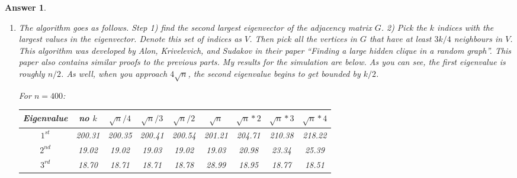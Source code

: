 \documentclass[12pt]{article}
\theoremstyle{colon}
\newtheorem*{answer}{Answer}
\begin{document}
\begin{answer}
\begin{enumerate}[label=\alph*)]
    Now let $1_k$ be the indicator of the $k$-clique indices of the graph.
    \begin{gather*}
      \lambda_2 \leq \frac{1_k^T A' 1_k}{k} = \frac{1_k^T A 1_k - 1_k^T \lambda_1 \frac{v v^T}{\lVert v \rVert^2} 1_k}{k} \\
      = \frac{1_k^T A 1_k - \lambda_1 \frac{\langle 1_k, v \rangle^2}{\lVert v \rVert^2}}{k}
    \end{gather*}

    Since $1_k$ is the indicator, then $1_k^T A 1_k$ counts the $k$-clique twice iteratively so it equals $k^2$. We will also replace $v = 1 - s$.
    \begin{gather*}
      = \frac{k^2 - \lambda_1 \frac{\langle 1_k, 1-s \rangle^2}{\lVert 1-s \rVert^2}}{k}
    \end{gather*}

    Going further requires one to use the bound on $\lambda_1$ found in the first question. That is, $\lambda_1 \leq \sqrt{n}$. Another bound to use would be $\lVert 1-s \rVert^2 = 1^T 1 - 2 s^T 1 + \lVert s \rVert^2 \leq n - s^T 1 + 5 + 5k^3/n^2 = O(k^3/n^2)$.

    \item The algorithm goes as follows. Step 1) find the second largest eigenvector of the adjacency matrix $G$. 2) Pick the $k$ indices with the largest values in the eigenvector. Denote this set of indices as $V$. Then pick all the vertices in $G$ that have at least $3k/4$ neighbours in $V$. This algorithm was developed by Alon, Krivelevich, and Sudakov in their paper ``Finding a large hidden clique in a random graph''. This paper also contains similar proofs to the previous parts. My results for the simulation are below. As you can see, the first eigenvalue is roughly $n/2$. As well, when you approach $4\sqrt{n}$, the second eigenvalue begins to get bounded by $k/2$.

    For $n=400$:
    \begin{center}
      \begin{tabular}{ | c | c | c | c | c | c | c | c | c |}
        \hline
        Eigenvalue & no $k$ & $\sqrt{n}/4$ & $\sqrt{n}/3$ & $\sqrt{n}/2$ & $\sqrt{n}$ & $\sqrt{n}*2$ & $\sqrt{n}*3$ & $\sqrt{n}*4$ \\
        \hline
        $1^{st}$ & 200.31 & 200.35 & 200.41 & 200.54 & 201.21 & 204.71 & 210.38 & 218.22 \\
        $2^{nd}$ & 19.02 & 19.02 & 19.03 & 19.02 & 19.03 & 20.98 & 23.34 & 25.39 \\
        $3^{rd}$ & 18.70 & 18.71 & 18.71 & 18.78 & 28.99 & 18.95 & 18.77 & 18.51 \\
        \hline
      \end{tabular}
    \end{center}


\end{enumerate}
\end{answer}
\end{document}

